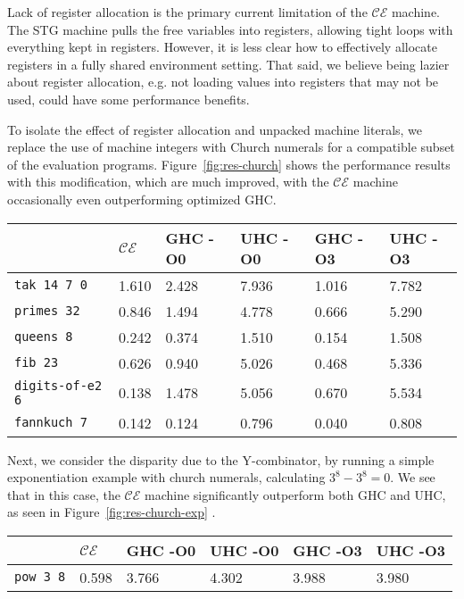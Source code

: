 Lack of register allocation is the primary current limitation of the $\mathcal{CE}$
machine. The STG machine pulls the free variables into registers, allowing tight
loops with everything kept in registers. However, it is less clear how to
effectively allocate registers in a fully shared environment setting.
That said, we believe being lazier about register allocation, e.g. not loading
values into registers that may not be used, could have some performance benefits.

To isolate the effect of register allocation and unpacked machine
literals, we replace the use of machine integers with Church numerals for a
compatible subset of the evaluation programs. Figure~\ref{fig:res-church}
shows the performance results with this modification, which are much improved,
with the $\mathcal{CE}$ machine occasionally even outperforming optimized GHC.

\begin{figure*}
\centering
\begin{tabularx}{\textwidth}{l | X | X | X | X | X}
& $\mathcal{CE}$ & GHC -O0 & UHC -O0 & GHC -O3 & UHC -O3 \\
\hline
\texttt{tak 14 7 0} & 1.610 & 2.428 & 7.936 & 1.016 & 7.782 \\
\texttt{primes 32} & 0.846 & 1.494 & 4.778 & 0.666 & 5.290 \\
\texttt{queens 8} & 0.242 & 0.374 & 1.510 & 0.154 & 1.508 \\
\texttt{fib 23} & 0.626 & 0.940 & 5.026 & 0.468 & 5.336 \\
\texttt{digits-of-e2 6} & 0.138 & 1.478 & 5.056 & 0.670 & 5.534 \\
\texttt{fannkuch 7} & 0.142 & 0.124 & 0.796 & 0.040 & 0.808 \\
\end{tabularx}
\caption{Church Numeral Benchmark Results. Measurement is wall clock time, 
units are seconds. Times averaged over 5 runs.}
\label{fig:res-church}
\end{figure*}

Next, we consider the disparity due to the Y-combinator, by running a simple
exponentiation example with church numerals, calculating $3^8 - 3^8 = 0$. We see
that in this case, the $\mathcal{CE}$ machine significantly outperform both GHC
and UHC, as seen in Figure~\ref{fig:res-church-exp} .

\begin{figure*}
\begin{tabularx}{\textwidth}{l | X | X | X | X | X}
& $\mathcal{CE}$ & GHC -O0 & UHC -O0 & GHC -O3 & UHC -O3 \\
\hline
\texttt{pow 3 8} & 0.598 & 3.766 & 4.302 & 3.988 & 3.980 \\
\end{tabularx}
\caption{Church Numeral Exponentiation Benchmark Results. Measurement is wall clock time, 
units are seconds. Times averaged over 5 runs}
\label{fig:res-church-exp}
\end{figure*}

